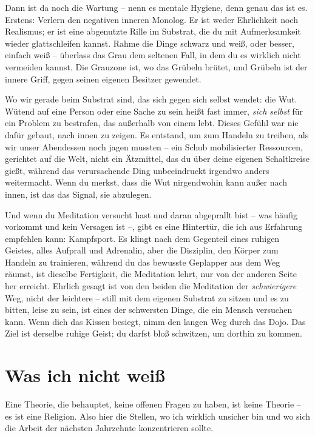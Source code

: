 \documentclass[11pt, twoside, openright]{book}
\begin{document}
Dann ist da noch die Wartung -- nenn es mentale Hygiene, denn genau das ist es. Erstens: Verlern den negativen inneren Monolog. Er ist weder Ehrlichkeit noch Realismus; er ist eine abgenutzte Rille im Substrat, die du mit Aufmerksamkeit wieder glattschleifen kannst. Rahme die Dinge schwarz und weiß, oder besser, einfach weiß -- überlass das Grau dem seltenen Fall, in dem du es wirklich nicht vermeiden kannst. Die Grauzone ist, wo das Grübeln brütet, und Grübeln ist der innere Griff, gegen seinen eigenen Besitzer gewendet.

Wo wir gerade beim Substrat sind, das sich gegen sich selbst wendet: die Wut. Wütend auf eine Person oder eine Sache zu sein heißt fast immer, \textit{sich selbst} für ein Problem zu bestrafen, das außerhalb von einem lebt. Dieses Gefühl war nie dafür gebaut, nach innen zu zeigen. Es entstand, um zum Handeln zu treiben, als wir unser Abendessen noch jagen mussten -- ein Schub mobilisierter Ressourcen, gerichtet auf die Welt, nicht ein Ätzmittel, das du über deine eigenen Schaltkreise gießt, während das verursachende Ding unbeeindruckt irgendwo anders weitermacht. Wenn du merkst, dass die Wut nirgendwohin kann außer nach innen, ist das das Signal, sie abzulegen.

Und wenn du Meditation versucht hast und daran abgeprallt bist -- was häufig vorkommt und kein Versagen ist --, gibt es eine Hintertür, die ich aus Erfahrung empfehlen kann: Kampfsport. Es klingt nach dem Gegenteil eines ruhigen Geistes, alles Aufprall und Adrenalin, aber die Disziplin, den Körper zum Handeln zu trainieren, während du das bewusste Geplapper aus dem Weg räumst, ist dieselbe Fertigkeit, die Meditation lehrt, nur von der anderen Seite her erreicht. Ehrlich gesagt ist von den beiden die Meditation der \textit{schwierigere} Weg, nicht der leichtere -- still mit dem eigenen Substrat zu sitzen und es zu bitten, leise zu sein, ist eines der schwersten Dinge, die ein Mensch versuchen kann. Wenn dich das Kissen besiegt, nimm den langen Weg durch das Dojo. Das Ziel ist derselbe ruhige Geist; du darfst bloß schwitzen, um dorthin zu kommen.

\section*{Was ich nicht weiß}

Eine Theorie, die behauptet, keine offenen Fragen zu haben, ist keine Theorie -- es ist eine Religion. Also hier die Stellen, wo ich wirklich unsicher bin und wo sich die Arbeit der nächsten Jahrzehnte konzentrieren sollte.
\end{document}
